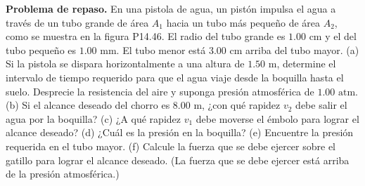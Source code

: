 \item \textbf{Problema de repaso.} En una pistola de agua, un pistón impulsa el agua a través de un tubo grande de área $A_1$ hacia un tubo más pequeño de área $A_2$, como se muestra en la figura P14.46. El radio del tubo grande es $1.00 \text{ cm}$ y el del tubo pequeño es $1.00 \text{ mm}$. El tubo menor está $3.00 \text{ cm}$ arriba del tubo mayor. (a) Si la pistola se dispara horizontalmente a una altura de $1.50 \text{ m}$, determine el intervalo de tiempo requerido para que el agua viaje desde la boquilla hasta el suelo. Desprecie la resistencia del aire y suponga presión atmosférica de $1.00 \text{ atm}$. (b) Si el alcance deseado del chorro es $8.00 \text{ m}$, ¿con qué rapidez $v_2$ debe salir el agua por la boquilla? (c) ¿A qué rapidez $v_1$ debe moverse el émbolo para lograr el alcance deseado? (d) ¿Cuál es la presión en la boquilla? (e) Encuentre la presión requerida en el tubo mayor. (f) Calcule la fuerza que se debe ejercer sobre el gatillo para lograr el alcance deseado. (La fuerza que se debe ejercer está arriba de la presión atmosférica.)
